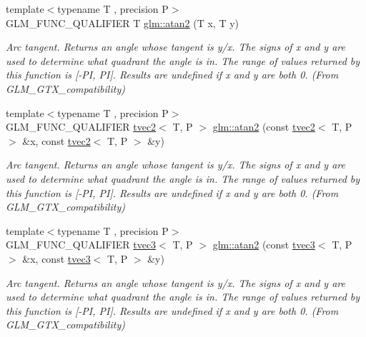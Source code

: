 \begin{DoxyCompactItemize}
{\footnotesize template$<$typename T , precision P$>$ }\\G\+L\+M\+\_\+\+F\+U\+N\+C\+\_\+\+Q\+U\+A\+L\+I\+F\+I\+ER T \hyperlink{group__gtx__compatibility_gac63011205bf6d0be82589dc56dd26708}{glm\+::atan2} (T x, T y)
\begin{DoxyCompactList}\small\item\em Arc tangent. Returns an angle whose tangent is y/x. The signs of x and y are used to determine what quadrant the angle is in. The range of values returned by this function is \mbox{[}-\/\+PI, PI\mbox{]}. Results are undefined if x and y are both 0. (From G\+L\+M\+\_\+\+G\+T\+X\+\_\+compatibility) \end{DoxyCompactList}\item 
\mbox{\label{group__gtx__compatibility_ga525f3e849d0fc64807f8ab571b4545f9}} 
{\footnotesize template$<$typename T , precision P$>$ }\\G\+L\+M\+\_\+\+F\+U\+N\+C\+\_\+\+Q\+U\+A\+L\+I\+F\+I\+ER \hyperlink{structglm_1_1tvec2}{tvec2}$<$ T, P $>$ \hyperlink{group__gtx__compatibility_ga525f3e849d0fc64807f8ab571b4545f9}{glm\+::atan2} (const \hyperlink{structglm_1_1tvec2}{tvec2}$<$ T, P $>$ \&x, const \hyperlink{structglm_1_1tvec2}{tvec2}$<$ T, P $>$ \&y)
\begin{DoxyCompactList}\small\item\em Arc tangent. Returns an angle whose tangent is y/x. The signs of x and y are used to determine what quadrant the angle is in. The range of values returned by this function is \mbox{[}-\/\+PI, PI\mbox{]}. Results are undefined if x and y are both 0. (From G\+L\+M\+\_\+\+G\+T\+X\+\_\+compatibility) \end{DoxyCompactList}\item 
\mbox{\label{group__gtx__compatibility_gad328042b6734d3f2c49c0ec1328b14c0}} 
{\footnotesize template$<$typename T , precision P$>$ }\\G\+L\+M\+\_\+\+F\+U\+N\+C\+\_\+\+Q\+U\+A\+L\+I\+F\+I\+ER \hyperlink{structglm_1_1tvec3}{tvec3}$<$ T, P $>$ \hyperlink{group__gtx__compatibility_gad328042b6734d3f2c49c0ec1328b14c0}{glm\+::atan2} (const \hyperlink{structglm_1_1tvec3}{tvec3}$<$ T, P $>$ \&x, const \hyperlink{structglm_1_1tvec3}{tvec3}$<$ T, P $>$ \&y)
\begin{DoxyCompactList}\small\item\em Arc tangent. Returns an angle whose tangent is y/x. The signs of x and y are used to determine what quadrant the angle is in. The range of values returned by this function is \mbox{[}-\/\+PI, PI\mbox{]}. Results are undefined if x and y are both 0. (From G\+L\+M\+\_\+\+G\+T\+X\+\_\+compatibility) \end{DoxyCompactList}\item 

\end{DoxyCompactItemize}
